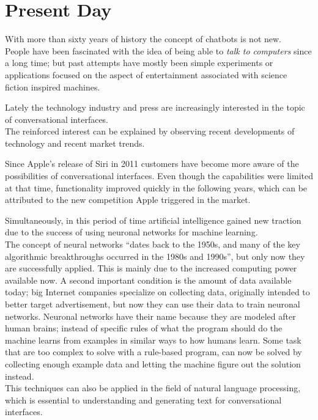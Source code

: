\section{Present Day}


With more than sixty years of history the concept of chatbots is not new.
\\
People have been fascinated with the idea of being able to \emph{talk to computers} since a long time; but past attempts have mostly been simple experiments or applications focused on the aspect of entertainment associated with science fiction inspired machines.

Lately the technology industry and press are increasingly interested in the topic of conversational interfaces.
\\
The reinforced interest can be explained by observing recent developments of technology and recent market trends.

Since Apple's release of Siri in 2011\cite{iphonelaunch} customers have become more aware of the possibilities of conversational interfaces. Even though the capabilities were limited at that time, functionality improved quickly in the following years, which can be attributed to the new competition Apple triggered in the market.

Simultaneously, in this period of time artificial intelligence gained new traction due to the success of using neuronal networks for machine learning\cite{mltrend}.
\\
The concept of neural networks ``dates back to the 1950s, and many of the key algorithmic breakthroughs occurred in the 1980s and 1990s''\cite{airevolution}, but only now they are successfully applied. This is mainly due to the increased computing power available now. A second important condition is the amount of data available today; big Internet companies specialize on collecting data, originally intended to better target advertisement, but now they can use their data to train neuronal networks. Neuronal networks have their name because they are modeled after human brains; instead of specific rules of what the program should do the machine learns from examples in similar ways to how humans learn. Some task that are too complex to solve with a rule-based program, can now be solved by collecting enough example data and letting the machine figure out the solution instead.
\\
This techniques can also be applied in the field of natural language processing, which is essential to understanding and generating text for conversational interfaces.
\\


